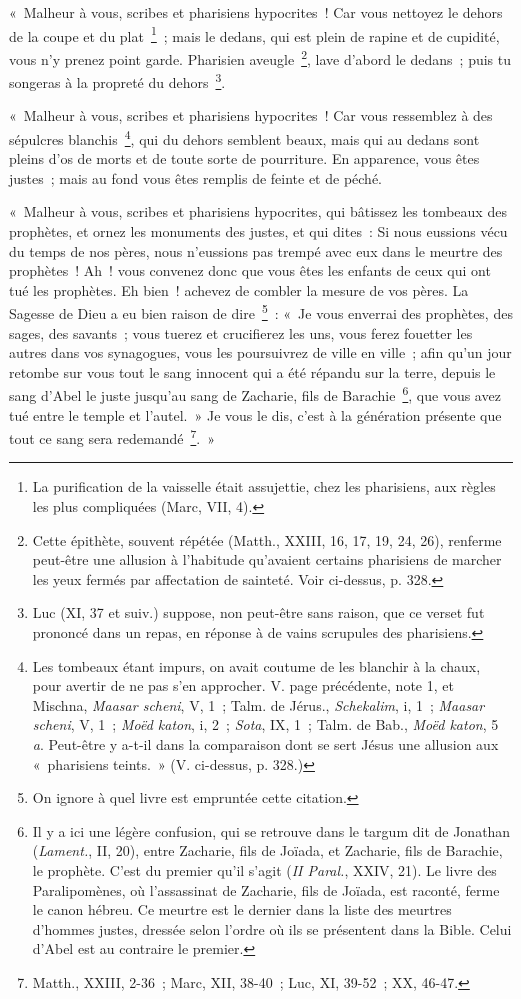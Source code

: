 \documentclass[french,twoside]{book} %
\newenvironment{quoteblock}%
  {\begin{quoting}}
  {\end{quoting}}
\newenvironment{quotebar}{%
    \def\FrameCommand{{\color{rubric!10!}\vrule width 0.5em} \hspace{0.9em}}%
    \def\OuterFrameSep{\itemsep} %
    \MakeFramed {\advance\hsize-\width \FrameRestore}
  }%
  {%
    \endMakeFramed
  }
\renewenvironment{quoteblock}%
  {%
    \savenotes
    \setstretch{0.9}
    \normalfont
    \begin{quotebar}
  }
  {%
    \end{quotebar}
    \spewnotes
  }
\begin{document}
\begin{quoteblock}
 « Malheur à vous, scribes et pharisiens hypocrites ! Car vous nettoyez le dehors de la coupe et du plat \footnote{La purification de la vaisselle était assujettie, chez les pharisiens, aux règles les plus compliquées (Marc, VII, 4).} ; mais le dedans, qui est plein de rapine et de cupidité, vous n’y prenez point garde. Pharisien aveugle \footnote{Cette épithète, souvent répétée (Matth., XXIII, 16, 17, 19, 24, 26), renferme peut-être une allusion à l’habitude qu’avaient certains pharisiens de marcher les yeux fermés par affectation de sainteté. Voir ci-dessus, p. 328.}, lave d’abord le dedans ; puis tu songeras à la propreté du dehors \footnote{Luc (XI, 37 et suiv.) suppose, non peut-être sans raison, que ce verset fut prononcé dans un repas, en réponse à de vains scrupules des pharisiens.}.\par
 « Malheur à vous, scribes et pharisiens hypocrites ! Car vous ressemblez à des sépulcres blanchis \footnote{ Les tombeaux étant impurs, on avait coutume de les blanchir à la chaux, pour avertir de ne pas s’en approcher. V. page précédente, note 1, et Mischna, {\itshape Maasar scheni}, V, 1 ; Talm. de Jérus., {\itshape Schekalim}, i, 1 ; {\itshape Maasar scheni}, V, 1 ; {\itshape Moëd katon}, i, 2 ; {\itshape Sota}, IX, 1 ; Talm. de Bab., {\itshape Moëd katon}, 5 {\itshape a}. Peut-être y a-t-il dans la comparaison dont se sert Jésus une allusion aux « pharisiens teints. » (V. ci-dessus, p. 328.)}, qui du dehors semblent beaux, mais qui au dedans sont pleins d’os de morts et de toute sorte de pourriture. En apparence, vous êtes justes ; mais au fond vous êtes remplis de feinte et de péché.\par
 « Malheur à vous, scribes et pharisiens hypocrites, qui bâtissez les tombeaux des prophètes, et ornez les monuments des justes, et qui dites : Si nous eussions vécu du temps de nos pères, nous n’eussions pas trempé avec eux dans le meurtre des prophètes ! Ah ! vous convenez donc que vous êtes les enfants de ceux qui ont tué les prophètes. Eh bien ! achevez de combler la mesure de vos pères. La Sagesse de Dieu a eu bien raison de dire \footnote{On ignore à quel livre est empruntée cette citation.} : « Je vous enverrai des prophètes, des sages, des savants ; vous tuerez et crucifierez les uns, vous ferez fouetter les autres dans vos synagogues, vous les poursuivrez de ville en ville ; afin qu’un jour retombe sur vous tout le sang innocent qui a été répandu sur la terre, depuis le sang d’Abel le juste jusqu’au sang de Zacharie, fils de Barachie \footnote{ Il y a ici une légère confusion, qui se retrouve dans le targum dit de Jonathan ({\itshape Lament.}, II, 20), entre Zacharie, fils de Joïada, et Zacharie, fils de Barachie, le prophète. C’est du premier qu’il s’agit ({\itshape II Paral.}, XXIV, 21). Le livre des Paralipomènes, où l’assassinat de Zacharie, fils de Joïada, est raconté, ferme le canon hébreu. Ce meurtre est le dernier dans la liste des meurtres d’hommes justes, dressée selon l’ordre où ils se présentent dans la Bible. Celui d’Abel est au contraire le premier.}, que vous avez tué entre le temple et l’autel. » Je vous le dis, c’est à la génération présente que tout ce sang sera redemandé \footnote{Matth., XXIII, 2-36 ; Marc, XII, 38-40 ; Luc, XI, 39-52 ; XX, 46-47.}. »

\end{quoteblock}
\end{document}
